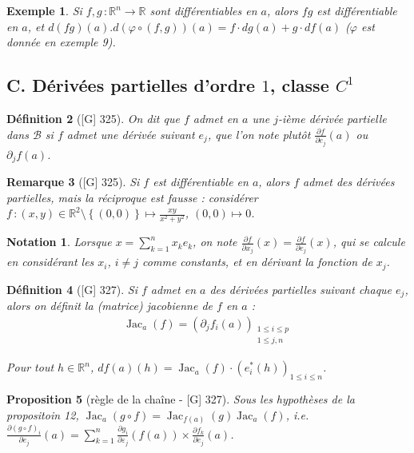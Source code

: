 \documentclass[10pt, a4paper, parskip=full, twoside, twocolumn]{report}
\newtheorem{definition}{Définition}
\newtheorem{proposition}[definition]{Proposition}
\newtheorem{example}[definition]{Exemple}
\newtheorem{remark}[definition]{Remarque}
\newtheorem*{notation*}{Notation}
\newcommand{\IR}{\mathbb{R}}
\newcommand{\B}{\mathcal{B}}
\DeclareMathOperator{\Jac}{Jac}
\begin{document}
\begin{example}
	Si $f,g\,\colon \IR^n\to \IR$ sont différentiables en $a$, alors $fg$ est différentiable en $a$, et $d(fg)(a). d(\varphi\circ (f,g))(a) = f\cdot dg(a) + g\cdot df(a)$ ($\varphi$ est donnée en exemple 9).
\end{example}

\subsection*{C. Dérivées partielles d'ordre $1$, classe $C^1$}

\begin{definition}[\textnormal{[G] 325}]
	On dit que $f$ admet en $a$ une \emph{$j$-ième dérivée partielle dans $\B$} si $f$ admet une dérivée suivant $e_j$, que l'on note plutôt $\frac{\partial f}{\partial e_j}(a)$ ou $\partial_jf(a)$.
\end{definition}

\begin{remark}[\textnormal{[G] 325}]
	Si $f$ est différentiable en $a$, alors $f$ admet des dérivées partielles, mais la réciproque est fausse : considérer $f\,\colon (x,y)\in \IR^2\setminus \left\{(0,0)\right\}\mapsto \frac{xy}{x^2+y^2}$, $(0,0)\mapsto 0$.
\end{remark}

\begin{notation*}
	Lorsque $x = \sum_{k=1}^{n}x_ke_k$, on note $\frac{\partial f}{\partial x_j}(x) = \frac{\partial f}{\partial e_j}(x)$, qui se calcule en considérant les $x_i$, $i\neq j$ comme constants, et en dérivant la fonction de $x_j$.
\end{notation*}

\begin{definition}[\textnormal{[G] 327}]
	Si $f$ admet en $a$ des dérivées partielles suivant chaque $e_j$, alors on définit la \emph{(matrice) jacobienne de $f$ en $a$} : 
	\begin{align*}
		\Jac_a(f) = \left(\partial_jf_i(a)\right)_{\substack{1\leq i\leq p \\ 1\leq j, n}}
	\end{align*}

	Pour tout $h\in \IR^n$, $df(a)(h)=\Jac_a(f)\cdot\left(e_i^*(h)\right)_{1\leq i\leq n}$.
\end{definition}

\begin{proposition}[règle de la chaîne - \textnormal{[G] 327}]
	Sous les hypothèses de la propositoin 12, $\Jac_a(g\circ f) = \Jac_{f(a)}(g)\Jac_a(f)$, \emph{i.e.} $\frac{\partial (g\circ f)_i}{\partial e_j}(a) = \sum_{k=1}^{n}\frac{\partial g_i}{\partial \varepsilon_j}(f(a))\times\frac{\partial f_k}{\partial e_j}(a)$.
\end{proposition}
\end{document}
